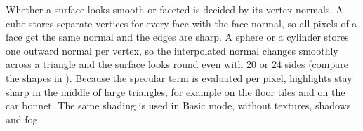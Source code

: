 Whether a surface looks smooth or faceted is decided by its vertex normals. A cube stores separate vertices for
every face with the face normal, so all pixels of a face get the same normal and the edges are sharp. A sphere or
a cylinder stores one outward normal per vertex, so the interpolated normal changes smoothly across a triangle
and the surface looks round even with 20 or 24 sides (compare the shapes in ). Because the
specular term is evaluated per pixel, highlights stay sharp in the middle of large triangles, for example on
the floor tiles and on the car bonnet. The same shading is used in Basic mode, without textures, shadows and fog.
